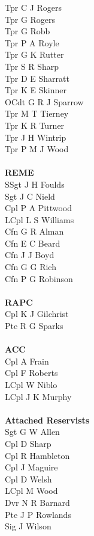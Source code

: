 \begin{multicols}{4}
  Tpr C J Rogers \\
  Tpr G Rogers \\
  Tpr G Robb \\
  Tpr P A Royle \\
  Tpr G K Rutter \\
  Tpr S R Sharp \\
  Tpr D E Sharratt \\
  Tpr K E Skinner \\
  OCdt G R J Sparrow \\
  Tpr M T Tierney \\
  Tpr K R Turner \\
  Tpr J H Wintrip \\
  Tpr P M J Wood \\
  \\
  \textbf{REME} \\
  SSgt J H Foulds \\
  Sgt J C Nield \\
  Cpl P A Pittwood \\
  LCpl L S Williams \\
  Cfn G R Alman \\
  Cfn E C Beard \\
  Cfn J J Boyd \\
  Cfn G G Rich \\
  Cfn P G Robinson \\
  \\
  \textbf{RAPC} \\
  Cpl K J Gilchrist \\
  Pte R G Sparks \\
  \\
  \textbf{ACC} \\
  Cpl A Frain \\
  Cpl F Roberts \\
  LCpl W Niblo \\
  LCpl J K Murphy \\
  \\
  \textbf{Attached Reservists} \\
  Sgt G W Allen \\
  Cpl D Sharp \\
  Cpl R Hambleton \\
  Cpl J Maguire \\
  Cpl D Welsh \\
  LCpl M Wood \\
  Dvr N R Barnard \\
  Pte J P Rowlands \\
  Sig J Wilson \\

\end{multicols}
